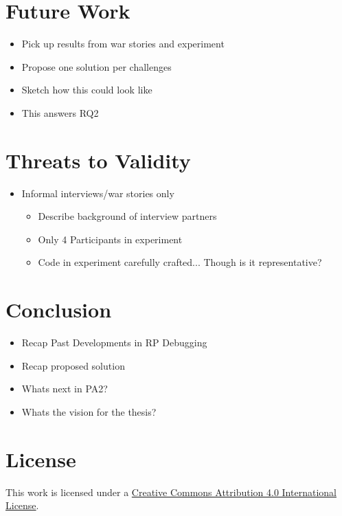 \documentclass[12pt,a4paper]{article}
\begin{document}
\section{Future Work}
\label{sec:future}

\begin{itemize}
	\item Pick up results from war stories and experiment
	\item Propose one solution per challenges
	\item Sketch how this could look like
	\item This answers RQ2
\end{itemize}

\section{Threats to Validity}
\label{sec:threats}

\begin{itemize}
	\item Informal interviews/war stories only
	\begin{itemize}
		\item Describe background of interview partners
		\item Only 4 Participants in experiment
		\item Code in experiment carefully crafted... Though is it representative?
		\
	\end{itemize}
\end{itemize}

\section{Conclusion}
\label{sec:conclusion}

\begin{itemize}
	\item Recap Past Developments in RP Debugging
	\item Recap proposed solution
	\item Whats next in PA2?
	\item Whats the vision for the thesis?
\end{itemize}





\section*{License}
\ccby\thinspace\thinspace This work is licensed under a \href{https://creativecommons.org/licenses/by/4.0/}{Creative Commons Attribution 4.0 International License}.
\end{document}
